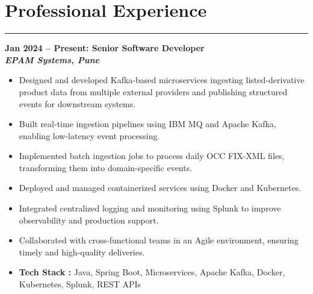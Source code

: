 \documentclass[11pt,a4paper]{article}
\newcommand{\blueitem}[1]{\textcolor{subtitleblue}{\textbf{#1}}}
\begin{document}

\vspace{0.3cm}
\section*{Professional Experience}
\hrule
\vspace{0.2cm}



\blueitem{Jan 2024 -- Present: Senior Software Developer} \\
\textbf{\textit{EPAM Systems, Pune}} 
\begin{itemize}
\item Designed and developed Kafka-based microservices ingesting listed-derivative product data from multiple external providers and publishing structured events for downstream systems.
\item Built real-time ingestion pipelines using IBM MQ and Apache Kafka, enabling low-latency event processing.
\item Implemented batch ingestion jobs to process daily OCC FIX-XML files, transforming them into domain-specific events.
\item Deployed and managed containerized services using Docker and Kubernetes.
\item Integrated centralized logging and monitoring using Splunk to improve observability and production support.
\item Collaborated with cross-functional teams in an Agile environment, ensuring timely and high-quality deliveries.
\item \textbf{Tech Stack :} Java, Spring Boot, Microservices, Apache Kafka, Docker, Kubernetes, Splunk, REST APIs
\end{itemize}

\vspace{0.6em}
\end{document}
